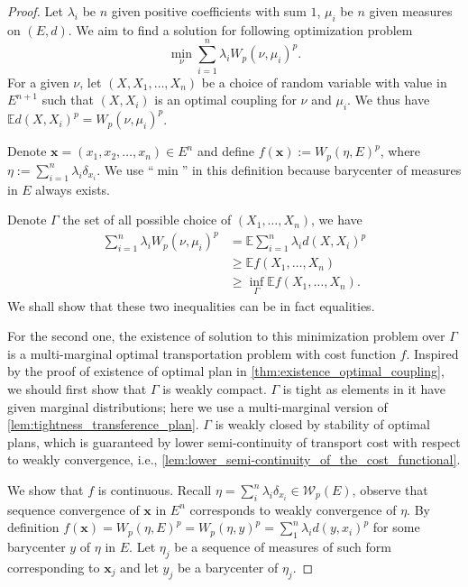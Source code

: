 \begin{proof}
	Let $\lambda_i$ be $n$ given positive coefficients with sum $1$,
	$\mu_i$ be $n$ given measures on $(E,d)$.
	We aim to find a solution for following optimization problem
	\[
		\min_{\nu} \sum_{i=1}^{n}\lambda_i W_p(\nu, \mu_i)^p.
	\]
	For a given $\nu$, let $(X, X_1,\ldots,X_n)$ be a choice of random variable with value in $E^{n+1}$ such that $(X,X_i)$ is an optimal coupling for $\nu$ and $\mu_i$. We thus have $\mathbb{E}d(X,X_i)^p = W_p(\nu, \mu_i)^p$.

	Denote $\boldsymbol{x}=(x_1, x_2, \ldots, x_n) \in E^n$ and define $f(\boldsymbol{x}):= W_p(\eta, E)^p$,
	where $\eta := \sum_{i=1}^{n} \lambda_i \delta_{x_i}$.
	We use ``$\min$'' in this definition because barycenter of measures in $E$ always exists.

	Denote $\Gamma$ the set of all possible choice of $(X_1, \ldots, X_n)$, we have
	\begin{align*}
		\sum_{i=1}^{n}\lambda_i W_p(\nu, \mu_i)^p & = \mathbb{E} \sum_{i=1}^{n}\lambda_i d(X,X_i)^p  \\
		                                          & \geq \mathbb{E} f(X_1, \ldots, X_n)              \\
		                                          & \geq \inf_\Gamma \mathbb{E} f(X_1, \ldots, X_n).
	\end{align*}
	We shall show that these two inequalities can be in fact equalities.

	For the second one, the existence of solution to this minimization problem over $\Gamma$
	is a multi-marginal optimal transportation problem with cost function $f$.
	Inspired by the proof of existence of optimal plan in \cref{thm:existence_optimal_coupling},
	we should first show that $\Gamma$ is weakly compact.
	$\Gamma$ is tight as elements in it have given marginal distributions;
	here we use a multi-marginal version of \cref{lem:tightness_transference_plan}.
	$\Gamma$ is weakly closed by stability of optimal plans,
	which is guaranteed by lower semi-continuity of transport cost with respect to weakly convergence,
	i.e., \cref{lem:lower_semi-continuity_of_the_cost_functional}.

	We show that $f$ is continuous.
	Recall $\eta= \sum_i^{n}\lambda_i \delta_{x_i} \in \mathcal{W}_p(E)$, observe that sequence convergence of $\boldsymbol{x}$ in $E^n$ corresponds to weakly convergence of $\eta$.
	By definition $f(\boldsymbol{x}) = W_p(\eta, E)^p=W_p(\eta, y)^p = \sum_{1}^{n} \lambda_i d(y, x_i)^p$
	for some barycenter $y$ of $\eta$ in $E$.
	Let $\eta_j$ be a sequence of measures of such form corresponding to $\boldsymbol{x}_j$ and
	let $y_j$ be a barycenter of $\eta_j$.


\end{proof}
